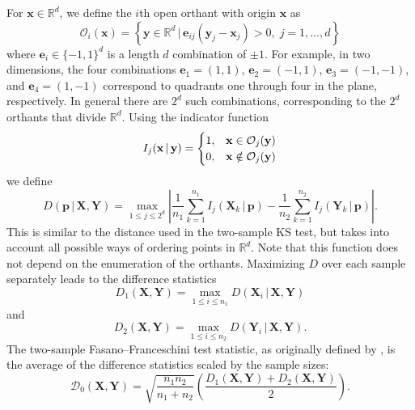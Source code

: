 For $\mathbf{x}\in\mathbb{R}^{d}$, we define the $i$th open orthant with origin $\mathbf{x}$ as
\begin{equation*}
\mathcal{O}_{i}(\mathbf{x})=\left\{\mathbf{y}\in\mathbb{R}^{d}\,\rvert\,\mathbf{e}_{ij}(\mathbf{y}_{j}-\mathbf{x}_{j})>0,\;j=1,\dots,d\right\}
\end{equation*}
where $\mathbf{e}_{i}\in\{-1,1\}^{d}$ is a length $d$ combination of $\pm 1$. For example, in two dimensions, the four combinations $\mathbf{e}_{1}=(1,1)$, $\mathbf{e}_{2}=(-1,1)$, $\mathbf{e}_{3}=(-1,-1)$, and $\mathbf{e}_{4}=(1,-1)$ correspond to quadrants one through four in the plane, respectively. In general there are $2^{d}$ such combinations, corresponding to the $2^{d}$ orthants that divide $\mathbb{R}^{d}$. Using the indicator function
\begin{equation*}
I_{j}(\mathbf{x}\,\rvert\,\mathbf{y})=
\begin{cases}
1,\hfill&\mathbf{x}\in\mathcal{O}_{j}(\mathbf{y})\\
0,\hfill&\mathbf{x}\notin\mathcal{O}_{j}(\mathbf{y})
\end{cases}
\end{equation*}
we define
\begin{equation}
\label{eq:diff}
D(\mathbf{p}\,\rvert\,\mathbf{X},\mathbf{Y})=\max_{1\leq j\leq 2^{d}}\left|\frac{1}{n_{1}}\sum_{k=1}^{n_{1}}I_{j}\left(\mathbf{X}_{k}\,\rvert\,\mathbf{p}\right)-\frac{1}{n_{2}}\sum_{k=1}^{n_{2}}I_{j}\left(\mathbf{Y}_{k}\,\rvert\,\mathbf{p}\right)\right|.
\end{equation}
This is similar to the distance used in the two-sample KS test, but takes into account all possible ways of ordering points in $\mathbb{R}^{d}$. Note that this function does not depend on the enumeration of the orthants. Maximizing $D$ over each sample separately leads to the difference statistics
\begin{equation*}
D_{1}(\mathbf{X},\mathbf{Y})=\max_{1\leq i\leq n_{1}}D(\mathbf{X}_{i}\,\rvert\,\mathbf{X},\mathbf{Y})
\end{equation*}
and
\begin{equation*}
D_{2}(\mathbf{X},\mathbf{Y})=\max_{1\leq i\leq n_{2}}D(\mathbf{Y}_{i}\,\rvert\,\mathbf{X},\mathbf{Y}).
\end{equation*}
The two-sample Fasano--Franceschini test statistic, as originally defined by \citet{ff1987}, is the average of the difference statistics scaled by the sample sizes:
\begin{equation}
\label{eq:ff_stat}
\mathcal{D}_{0}(\mathbf{X},\mathbf{Y})=\sqrt{\frac{n_{1}n_{2}}{n_{1}+n_{2}}}\left(\frac{D_{1}(\mathbf{X},\mathbf{Y})+D_{2}(\mathbf{X},\mathbf{Y})}{2}\right).
\end{equation}
